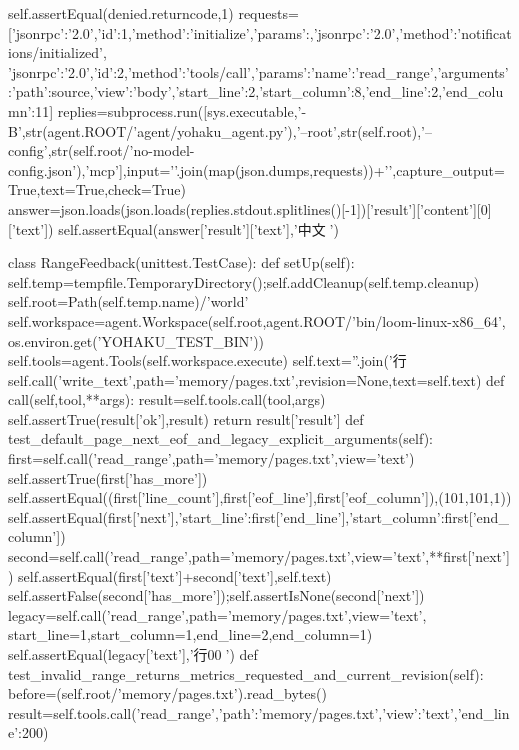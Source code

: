         self.assertEqual(denied.returncode,1)
        requests=[{'jsonrpc':'2.0','id':1,'method':'initialize','params':{}},{'jsonrpc':'2.0','method':'notifications/initialized'},
            {'jsonrpc':'2.0','id':2,'method':'tools/call','params':{'name':'read_range','arguments':{'path':source,'view':'body','start_line':2,'start_column':8,'end_line':2,'end_column':11}}}]
        replies=subprocess.run([sys.executable,'-B',str(agent.ROOT/'agent/yohaku_agent.py'),'--root',str(self.root),'--config',str(self.root/'no-model-config.json'),'mcp'],input='\n'.join(map(json.dumps,requests))+'\n',capture_output=True,text=True,check=True)
        answer=json.loads(json.loads(replies.stdout.splitlines()[-1])['result']['content'][0]['text'])
        self.assertEqual(answer['result']['text'],'中文🧸')


class RangeFeedback(unittest.TestCase):
    def setUp(self):
        self.temp=tempfile.TemporaryDirectory();self.addCleanup(self.temp.cleanup)
        self.root=Path(self.temp.name)/'world'
        self.workspace=agent.Workspace(self.root,agent.ROOT/'bin/loom-linux-x86_64',
                                       os.environ.get('YOHAKU_TEST_BIN'))
        self.tools=agent.Tools(self.workspace.execute)
        self.text=''.join('行%
        self.call('write_text',path='memory/pages.txt',revision=None,text=self.text)
    def call(self,tool,**args):
        result=self.tools.call(tool,args)
        self.assertTrue(result['ok'],result)
        return result['result']
    def test_default_page_next_eof_and_legacy_explicit_arguments(self):
        first=self.call('read_range',path='memory/pages.txt',view='text')
        self.assertTrue(first['has_more'])
        self.assertEqual((first['line_count'],first['eof_line'],first['eof_column']),(101,101,1))
        self.assertEqual(first['next'],{'start_line':first['end_line'],'start_column':first['end_column']})
        second=self.call('read_range',path='memory/pages.txt',view='text',**first['next'])
        self.assertEqual(first['text']+second['text'],self.text)
        self.assertFalse(second['has_more']);self.assertIsNone(second['next'])
        legacy=self.call('read_range',path='memory/pages.txt',view='text',
                         start_line=1,start_column=1,end_line=2,end_column=1)
        self.assertEqual(legacy['text'],'行00🧸\n')
    def test_invalid_range_returns_metrics_requested_and_current_revision(self):
        before=(self.root/'memory/pages.txt').read_bytes()
        result=self.tools.call('read_range',{'path':'memory/pages.txt','view':'text','end_line':200})
